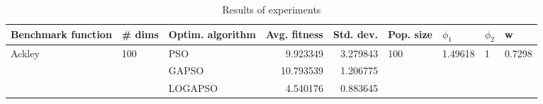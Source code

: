 \begin{table}
\centering
\caption{Results of experiments}
\begin{tabular}{lllrrllll}
\toprule
     Benchmark function &              \# dims & Optim. algorithm &  Avg. fitness &  Std. dev. &            Pop. size &               $\phi_{1}$ &         $\phi_{2}$ &                       w \\
\midrule
\multirow{3}{*}{Ackley} & \multirow{3}{*}{100} &              PSO &      9.923349 &   3.279843 & \multirow{3}{*}{100} & \multirow{3}{*}{1.49618} & \multirow{3}{*}{1} & \multirow{3}{*}{0.7298} \\
                        &                      &            GAPSO &     10.793539 &   1.206775 &                      &                          &                    &                         \\
                        &                      &          LOGAPSO &      4.540176 &   0.883645 &                      &                          &                    &                         \\
\bottomrule
\end{tabular}
\end{table}
